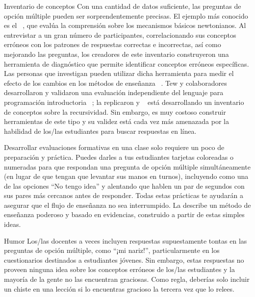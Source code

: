 \begin{aside}{Inventario de conceptos}
Con una cantidad de datos suficiente,
las preguntas de opción múltiple pueden ser sorprendentemente precisas.
El ejemplo más conocido es el
  ~\cite{Hest1992},
que evalúa la comprensión sobre los mecanismos básicos newtonianos.
Al entrevistar a un gran número de participantes,
correlacionando sus conceptos erróneos con los patrones de respuestas correctas e incorrectas,
así como mejorando las preguntas,
los creadores de este inventario construyeron una herramienta de diagnóstico que permite identificar conceptos erróneos específicas.
Las personas  que investigan pueden utilizar dicha herramienta para medir el efecto de los cambios en los métodos de enseñanza ~\cite{Hake1998}.
Tew y colaboradores desarrollaron y validaron una evaluación independiente del lenguaje para programación introductoria ~\cite{Tew2011};
 \cite{Park2016} la replicaron y ~\cite{Hamo2017} está desarrollando un inventario de conceptos sobre la recursividad.
Sin embargo,
es muy costoso construir herramientas de este tipo
y su validez está cada vez más amenazada por la habilidad de los/las estudiantes para buscar respuestas en línea.
\end{aside}

Desarrollar evaluaciones formativas en una clase solo requiere un poco de preparación y práctica.
Puedes darles a tus estudiantes tarjetas coloreadas o numeradas para que respondan una pregunta 
de opción múltiple simultáneamente (en lugar de que tengan que levantar sus manos en turnos), 
incluyendo como una de las opciones ``No tengo idea''
y alentando que hablen un par de segundos con sus pares más cercanos antes de responder. 
Todas estas prácticas te ayudarán a asegurar que el flujo de enseñanza no sea interrumpido.
La  describe un método de enseñanza poderoso y basado en evidencias, 
construido a partir de estas simples ideas. 

\begin{aside}{Humor}
Los/las docentes a veces incluyen respuestas supuestamente tontas en las 
preguntas de opción múltiple, como ``¡mi nariz!'', particularmente en los cuestionarios destinados a estudiantes jóvenes.
Sin embargo,
estas respuestas no proveen ninguna idea sobre los conceptos erróneos de los/las estudiantes 
y la mayoría de la gente no las encuentran graciosas.
Como regla,
deberías solo incluir un chiste en una lección si lo encuentras gracioso la tercera vez que lo relees.
\end{aside}

